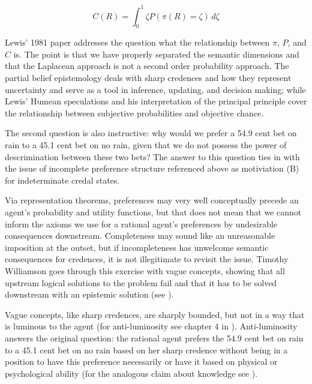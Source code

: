 \begin{equation}
  \label{eq:s2}
  C(R)=\int_{0}^{1}\zeta{}P(\pi(R)=\zeta)\,d\zeta
\end{equation}

Lewis' 1981 paper  addresses the question what the
relationship between $\pi$, $P$, and $C$ is. The point
is that we have properly separated the semantic
dimensions and that the Laplacean approach is not a
second order probability approach. The partial belief
epistemology deals with sharp credences and how they
represent uncertainty and serve as a tool in inference,
updating, and decision making; while Lewis' Humean
speculations and his interpretation of the principal
principle cover the relationship between subjective
probabilities and objective chance.

The second question is also instructive: why would we
prefer a 54.9 cent bet on rain to a 45.1 cent bet on no
rain, given that we do not possess the power of
descrimination between these two bets? The answer to
this question ties in with the issue of incomplete
preference structure referenced above as motiviation
(B) for indeterminate credal states.

Via representation theorems, preferences may very well
conceptually precede an agent's probability and utility
functions, but that does not mean that we cannot inform
the axioms we use for a rational agent's preferences by
undesirable consequences downstream. Completeness may
sound like an unreasonable imposition at the outset,
but if incompleteness has unwelcome semantic
consequences for credences, it is not illegitimate to
revisit the issue. Timothy Williamson goes through this
exercise with vague concepts, showing that all upstream
logical solutions to the problem fail and that it has
to be solved downstream with an epistemic solution (see
).

Vague concepts, like sharp credences, are sharply
bounded, but not in a way that is luminous to the agent
(for anti-luminosity see chapter 4 in
). Anti-luminosity answers the
original question: the rational agent prefers the 54.9
cent bet on rain to a 45.1 cent bet on no rain based on
her sharp credence without being in a position to have
this preference necessarily or have it based on
physical or psychological ability (for the analogous
claim about knowledge see ).

